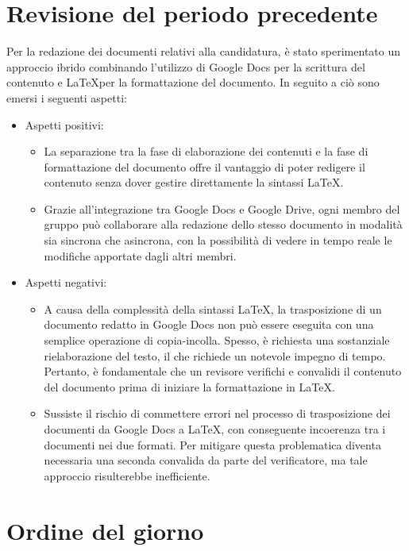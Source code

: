 \documentclass{article}
\begin{document}
\section{Revisione del periodo precedente}
Per la redazione dei documenti relativi alla candidatura, è stato sperimentato un approccio ibrido combinando l'utilizzo di Google Docs per la scrittura del contenuto e \LaTeX per la formattazione del documento. In seguito a ciò sono emersi i seguenti aspetti: 
\begin{itemize}
    \item Aspetti positivi:  
        \begin{itemize}
            \item La separazione tra la fase di elaborazione dei contenuti e la fase di formattazione del documento offre il vantaggio di poter redigere il contenuto senza dover gestire direttamente la sintassi \LaTeX.
            \item Grazie all’integrazione tra Google Docs e Google Drive, ogni membro del gruppo può collaborare alla redazione dello stesso documento in modalità sia sincrona che asincrona, con la possibilità di vedere in tempo reale le modifiche apportate dagli altri membri.
        \end{itemize}
    \item Aspetti negativi:  
        \begin{itemize}
            \item A causa della complessità della sintassi \LaTeX, la trasposizione di un documento redatto in Google Docs non può essere eseguita con una semplice operazione di copia-incolla. Spesso, è richiesta una sostanziale rielaborazione del testo, il che richiede un notevole impegno di tempo. Pertanto, è fondamentale che un revisore verifichi e convalidi il contenuto del documento prima di iniziare la formattazione in \LaTeX.
            \item Sussiste il rischio di commettere errori nel processo di trasposizione dei documenti da Google Docs a \LaTeX, con conseguente incoerenza tra i documenti nei due formati. Per mitigare questa problematica diventa necessaria una seconda convalida da parte del verificatore, ma tale approccio risulterebbe inefficiente.
        \end{itemize}
\end{itemize}

\section{Ordine del giorno}
\end{document}
